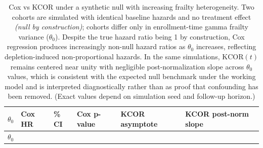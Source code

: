 \documentclass[
]{article}
\begin{document}
\begin{longtable}[]{@{}
  >{\raggedleft\arraybackslash}p{}
  >{\raggedleft\arraybackslash}p{}
  >{\raggedleft\arraybackslash}p{}
  >{\raggedleft\arraybackslash}p{}
  >{\raggedleft\arraybackslash}p{}
  >{\raggedleft\arraybackslash}p{}@{}}
\caption{Cox vs KCOR under a synthetic null with increasing frailty
heterogeneity. Two cohorts are simulated with identical baseline hazards
and no treatment effect \emph{(null by construction)}; cohorts differ
only in enrollment-time gamma frailty variance (\(\theta_0\)). Despite
the true hazard ratio being 1 by construction, Cox regression produces
increasingly non-null hazard ratios as \(\theta_0\) increases,
reflecting depletion-induced non-proportional hazards. In the same
simulations, \(\mathrm{KCOR}(t)\) remains centered near unity with
negligible post-normalization slope across \(\theta_0\) values, which is
consistent with the expected null benchmark under the working model and
is interpreted diagnostically rather than as proof that confounding has
been removed. (Exact values depend on simulation seed and follow-up
horizon.)}\label{tbl:cox_bias_demo}\tabularnewline
\toprule\noalign{}
\begin{minipage}[b]{\linewidth}\raggedleft
\(\theta_0\)
\end{minipage} & \begin{minipage}[b]{\linewidth}\raggedleft
Cox HR
\end{minipage} & \begin{minipage}[b]{\linewidth}\raggedleft
95\% CI
\end{minipage} & \begin{minipage}[b]{\linewidth}\raggedleft
Cox p-value
\end{minipage} & \begin{minipage}[b]{\linewidth}\raggedleft
KCOR asymptote
\end{minipage} & \begin{minipage}[b]{\linewidth}\raggedleft
KCOR post-norm slope
\end{minipage} \\
\midrule\noalign{}
\endfirsthead
\toprule\noalign{}
\begin{minipage}[b]{\linewidth}\raggedleft
\(\theta_0\)
\end{minipage} & \begin{minipage}[b]{\linewidth}\raggedleft

\end{minipage}
\end{longtable}
\end{document}
